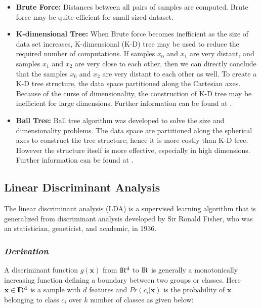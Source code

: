 \begin{itemize}
    \item \textbf{Brute Force:} Distances between all pairs of samples are computed. Brute force may be quite efficient for small sized dataset.
    
    \item \textbf{K-dimensional Tree:} When Brute force becomes inefficient as the size of  data set increases, K-dimensional (K-D) tree may be used to reduce the required number of computations. If samples $x_{0}$ and $x_{1}$ are very distant, and samples $x_{1}$ and $x_{2}$ are very close to each other, then we can directly conclude that the samples $x_{0}$ and $x_{2}$ are very distant to each other as well. To create a K-D tree structure, the data space partitioned along the Cartesian axes. Because of the curse of dimensionality, the construction of K-D tree may be inefficient for large dimensions. Further information can be found at \cite{kd_tree}.
    
    \item \textbf{Ball Tree:} Ball tree algorithm was developed to solve the size and dimensionality problems. The data space are partitioned along the spherical axes to construct the tree structure; hence it is more costly than K-D tree. However the structure itself is more effective, especially in high dimensions. Further information can be found at \cite{ball_tree}.
    
\end{itemize}

\subsection{Linear Discriminant Analysis}

The linear discriminant analysis (LDA) is a supervised learning algorithm that is generalized from discriminant analysis developed by Sir Ronald Fisher, who was an statistician, geneticist, and academic, in 1936.

\subsubsection*{\textit{Derivation}}

A discriminant function $g(\textbf{x})$ from $\rm I\!R^{d}$ to $\rm I\!R$ is generally a monotonically increasing function defining a boundary between two groups or classes. Here $\textbf{x} \in \rm I\!R^{d}$ is a sample with $d$ features and $Pr(c_{i} | \textbf{x})$ is the probability of $\textbf{x}$ belonging to class $c_{i}$ over $k$ number of classes as given below:

